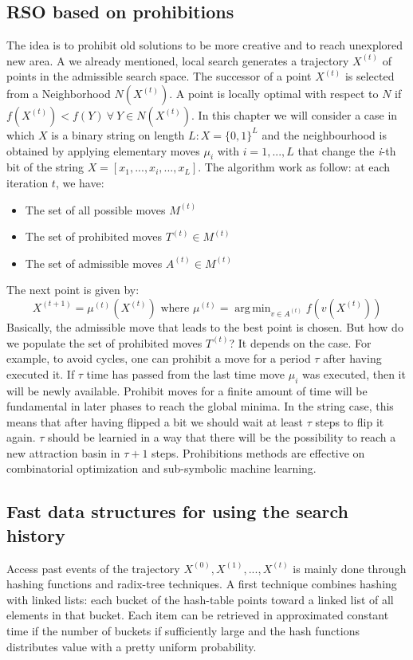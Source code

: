 \documentclass[10pt]{article}
\DeclareMathOperator*{\argmin}{arg\,min}
\begin{document}
\subsection{RSO based on prohibitions}
The idea is to prohibit old solutions to be more creative and to reach unexplored new area. A we already mentioned, local search generates a trajectory $X^{(t)}$ of points in the admissible search space. The successor of a point $X^{(t)}$ is selected from a Neighborhood $N(X^{(t)})$. A point is locally optimal with respect to $N$ if $f(X^{(t)}) < f(Y) \ \forall \ Y \in N(X^{(t)})$. In this chapter we will consider a case in which $X$ is a binary string on length $L: X = \{0,1\}^L$ and the neighbourhood is obtained by applying elementary moves $\mu_{i}$ with $i = 1,...,L$ that change the \textit{i}-th bit of the string $X = [x_{1},...,x_{i},...,x_{L}]$. The algorithm work as follow: at each iteration $t$, we have:
\begin{itemize}
\item{The set of all possible moves $M^{(t)}$}
\item{The set of prohibited moves $T^{(t)} \in M^{(t)}$}
\item{The set of admissible moves $A^{(t)} \in M^{(t)}$}
\end{itemize}
The next point is given by:
$$
X^{(t+1)} = \mu^{(t)}(X^{(t)}) \text{ where } \mu^{(t)} = \argmin_{v \in A^{(t)}} f(v(X^{(t)}))
$$
Basically, the admissible move that leads to the best point is chosen. But how do we populate the set of prohibited moves $T^{(t)}$? It depends on the case. For example, to avoid cycles, one can prohibit a move for a period $\tau$ after having executed it. If $\tau$ time has passed from the last time move $\mu_{i}$ was executed, then it will be newly available. Prohibit moves for a finite amount of time will be fundamental in later phases to reach the global minima. In the string case, this means that after having flipped a bit we should wait at least $\tau$ steps to flip it again. $\tau$ should be learnied in a way that there will be the possibility to reach a new attraction basin in $\tau + 1$ steps. Prohibitions methods are effective on combinatorial optimization and sub-symbolic machine learning.

\subsection{Fast data structures for using the search history}
Access past events of the trajectory $X^{(0)}, X^{(1)}, ..., X^{(t)}$ is mainly done through hashing functions and radix-tree techniques. A first technique combines hashing with linked lists: each bucket of the hash-table points toward a linked list of all elements in that bucket. Each item can be retrieved in approximated constant time if the number of buckets if sufficiently large and the hash functions distributes value with a pretty uniform probability.
\end{document}
